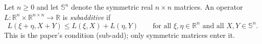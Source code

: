 \begin{definition}
Let $n\ge0$ and let $\mathbb S^n$ denote the symmetric real $n\times n$ matrices. An operator $L:\mathbb R^n\times\mathbb R^{n\times n}\to\mathbb R$ is \emph{subadditive} if
\[
L(\xi+\eta,X+Y)\le L(\xi,X)+L(\eta,Y)\qquad\text{for all }\xi,\eta\in\mathbb R^n\text{ and all }X,Y\in\mathbb S^n .
\]
This is the paper's condition (sub-add); only symmetric matrices enter it.
\end{definition}

